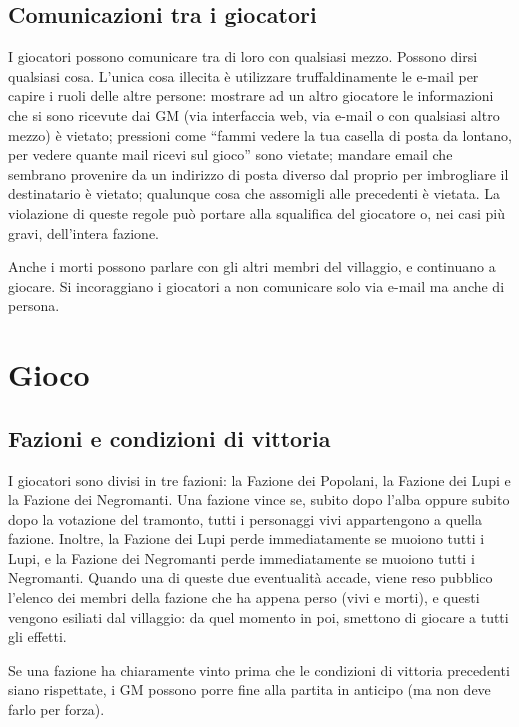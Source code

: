 \documentclass[a4paper,10pt]{article}
\begin{document}
\subsection{Comunicazioni tra i giocatori}

I giocatori possono comunicare tra di loro con qualsiasi mezzo. Possono dirsi qualsiasi cosa.
L'unica cosa illecita è utilizzare truffaldinamente le e-mail per capire i ruoli delle altre persone: mostrare ad un altro giocatore le informazioni che si sono ricevute dai GM (via interfaccia web, via e-mail o con qualsiasi altro mezzo) è vietato; pressioni come ``fammi vedere la tua casella di posta da lontano, per vedere quante mail ricevi sul gioco'' sono vietate; mandare email che sembrano provenire da un indirizzo di posta diverso dal proprio per imbrogliare il destinatario è vietato; qualunque cosa che assomigli alle precedenti è vietata. La violazione di queste regole può portare alla squalifica del giocatore o, nei casi più gravi, dell'intera fazione.

Anche i morti possono parlare con gli altri membri del villaggio, e continuano a giocare. Si incoraggiano i giocatori a non comunicare solo via e-mail ma anche di persona.


\pagebreak
\section{Gioco}


\subsection{Fazioni e condizioni di vittoria}

I giocatori sono divisi in tre fazioni: la Fazione dei Popolani, la Fazione dei Lupi e la Fazione dei Negromanti.
Una fazione vince se, subito dopo l'alba oppure subito dopo la votazione del tramonto, tutti i personaggi vivi appartengono a quella fazione.
Inoltre, la Fazione dei Lupi perde immediatamente se muoiono tutti i Lupi, e la Fazione dei Negromanti perde immediatamente se muoiono tutti i Negromanti. Quando una di queste due eventualità accade, viene reso pubblico l'elenco dei membri della fazione che ha appena perso (vivi e morti), e questi vengono esiliati dal villaggio: da quel momento in poi, smettono di giocare a tutti gli effetti.

Se una fazione ha chiaramente vinto prima che le condizioni di vittoria precedenti siano rispettate, i GM possono porre fine alla partita in anticipo (ma non deve farlo per forza).
\end{document}

